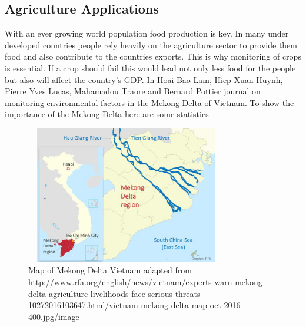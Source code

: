 \documentclass[article]{IEEEtran}
\begin{document}
\subsection{Agriculture Applications}

With an ever growing world population food production is key. In many under developed countries people rely heavily on the agriculture sector to provide them food and also contribute to the countries exports. This is why monitoring of crops is essential. If a crop should fail this would lead not only less food for the people but also will affect the country’s GDP. In Hoai Bao Lam, Hiep Xuan Huynh, Pierre Yves Lucas, Mahamadou Traore and Bernard Pottier journal on monitoring environmental factors in the Mekong Delta of Vietnam. To show the importance of the Mekong Delta here are some statistics\cite{MekongDelta}

\begin{figure}[h!]
\graphicspath{ {images/} }
\includegraphics[width=8.8cm, height=6cm]{mekongdelta}
\caption{Map of Mekong Delta Vietnam adapted from http://www.rfa.org/english/news/vietnam/experts-warn-mekong-delta-agriculture-livelihoods-face-serious-threats-10272016103647.html/vietnam-mekong-delta-map-oct-2016-400.jpg/image}
\label{Map of Mekong Delta}
\end{figure}
\end{document}
